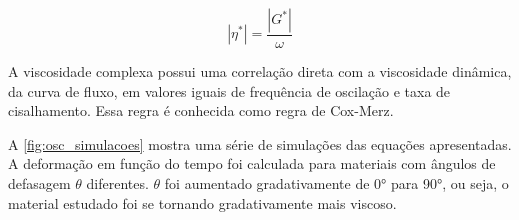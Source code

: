 			\begin{equation} 
			| \eta^* | = \dfrac{ |G^*| } {\omega}
			\label{eqn:visc_complexa}
			\end{equation}
			
			A viscosidade complexa possui uma correlação direta com a viscosidade dinâmica, da curva de fluxo, em valores iguais de frequência de oscilação e taxa de cisalhamento. Essa regra é conhecida como regra de Cox-Merz.\cite{Merz1958, Manero2002a} 
			
			A \autoref{fig:osc_simulacoes} mostra uma série de simulações das equações apresentadas. A deformação em função do tempo foi calculada para materiais com ângulos de defasagem \(\theta\) diferentes. \(\theta\) foi aumentado gradativamente de 0° para 90°, ou seja, o material estudado foi se tornando gradativamente mais viscoso.

